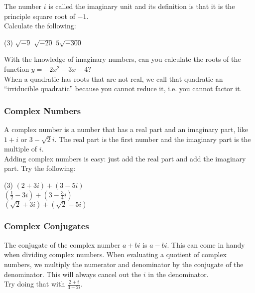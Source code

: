 \documentclass[12pt,fleqn]{book}
\begin{document}
The number $i$ is called the imaginary unit and its definition is that it is the principle square root of $-1$.
\\[1em]
Calculate the following:
\begin{tasks}(3)
	\task $\sqrt{-9}$
	\task $\sqrt{-20}$
	\task $5\sqrt{-300}$
\end{tasks}
\clearpage
With the knowledge of imaginary numbers, can you calculate the roots of the function $y=-2x^{2}+3x-4$?
\\[4em]
When a quadratic has roots that are not real, we call that quadratic an ``irriducible quadratic'' because you cannot reduce it, i.e. you cannot factor it.
\subsubsection*{Complex Numbers}
A complex number is a number that has a real part and an imaginary part, like $1+i$ or $3-\sqrt2 i$.  The real part is the first number and the imaginary part is the multiple of $i$.  \\[1em]
Adding complex numbers is easy: just add the real part and add the imaginary part.  Try the following:
\begin{tasks}(3)
	\task $\left(2+3i\right) + \left(3-5i\right)$\\[2em]
	\task $\left(\frac 12-3i\right) + \left(3-\frac 34i\right)$\\[2em]
	\task $\left(\sqrt 2+3i\right) + \left(\sqrt 2-5i\right)$\\[2em]
\end{tasks}
\subsubsection*{Complex Conjugates}
The conjugate of the complex number $a+bi$ is $a-bi$.  This can come in handy when dividing complex numbers.  When evaluating a quotient of complex numbers, we multiply the numerator and denominator by the conjugate of the denominator.  This will always cancel out the $i$ in the denominator.
\\[1em]
Try doing that with $\displaystyle \frac{2+i}{3-2i}$.
\\[4em]
\end{document}
